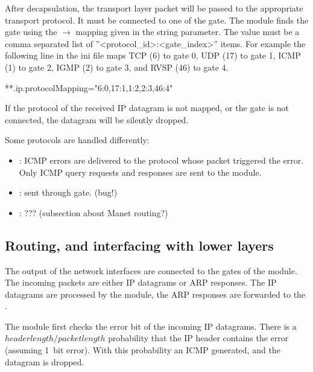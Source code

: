 After decapsulation, the transport layer packet will be passed to the appropriate
transport protocol. It must be connected to one of the  gate.
The  module finds the gate using the $\rightarrow$
 mapping given in the  string parameter.
The value must be a comma separated list of ''<protocol\_id>:<gate\_index>'' items.
For example the following line in the ini file maps TCP (6) to gate 0, UDP (17)
to gate 1, ICMP (1) to gate 2, IGMP (2) to gate 3, and RVSP (46) to gate 4.
\begin{inifile}
**.ip.protocolMapping="6:0,17:1,1:2,2:3,46:4"
\end{inifile}
If the protocol of the received IP datagram is not mapped, or the gate
is not connected, the datagram will be silently dropped.

Some protocols are handled differently:
\begin{itemize}
  \item {}: ICMP errors are delivered to the protocol
        whose packet triggered the error. Only ICMP query
        requests and responses are sent to the  module.
  \item {}: sent through  gate. (bug!)
  \item {}: ??? (subsection about Manet routing?)
\end{itemize}



\subsection{Routing, and interfacing with lower layers}
\label{subsec:ip_routing}

The output of the network interfaces are connected to the
 gates of the  module. The incoming
packets are either IP datagrams or ARP responses. The IP datagrams
are processed by the  module, the ARP
responses are forwarded to the . 

The  module first checks the error bit of the
incoming IP datagrams. There is a $header length/packet length$
probability that the IP header contains the error (assuming
1~bit error). With this probability an ICMP 
generated, and the datagram is dropped.

